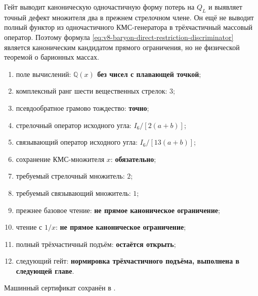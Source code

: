 \begin{nogocriterion}
Гейт выводит каноническую одночастичную форму потерь на $Q_L$ и выявляет
точный дефект множителя два в прежнем стрелочном члене. Он ещё не выводит
полный функтор из одночастичного КМС-генератора в трёхчастичный массовый
оператор. Поэтому формула \eqref{eq:v8-baryon-direct-restriction-discriminator}
является каноническим кандидатом прямого ограничения, но не физической
теоремой о барионных массах.
\end{nogocriterion}

\begin{protocol}
\begin{enumerate}
 \item поле вычислений: \textbf{$\mathbb Q(x)$ без чисел с плавающей точкой};
 \item комплексный ранг шести вещественных стрелок: \textbf{$3$};
 \item псевдообратное грамово тождество: \textbf{точно};
 \item стрелочный оператор исходного угла: \textbf{$I_6/[2(a+b)]$};
 \item связывающий оператор исходного угла: \textbf{$I_6/[13(a+b)]$};
 \item сохранение КМС-множителя $x$: \textbf{обязательно};
 \item требуемый стрелочный множитель: \textbf{$2$};
 \item требуемый связывающий множитель: \textbf{$1$};
 \item прежнее базовое чтение: \textbf{не прямое каноническое ограничение};
 \item чтение с $1/x$: \textbf{не прямое каноническое ограничение};
 \item полный трёхчастичный подъём: \textbf{остаётся открыть};
 \item следующий гейт: \textbf{нормировка трёхчастичного подъёма,
 выполнена в следующей главе}.
\end{enumerate}
\end{protocol}

Машинный сертификат сохранён в
.
